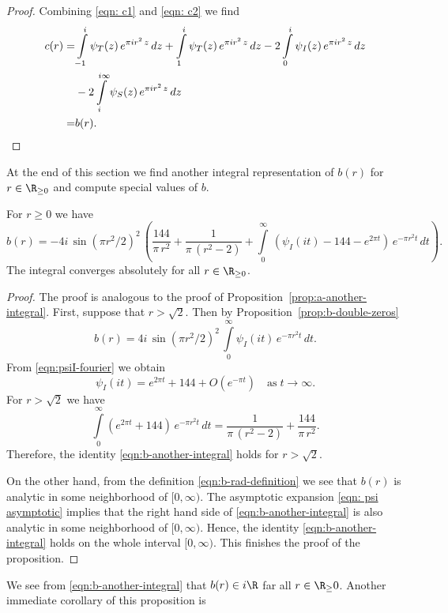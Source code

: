 \begin{proof}
Combining \eqref{eqn: c1} and \eqref{eqn: c2} we find
\begin{align}c(r)=&\int\limits_{-1}^{i}\psi_T(z)\,e^{\pi i r^2 \,z}\,dz+\int\limits_{1}^{i}\psi_T(z)\,e^{\pi i r^2 \,z}\,dz
-2\int\limits_{0}^{i}\psi_I(z)\,e^{\pi i r^2 \,z}\,dz\notag\\
&-2\int\limits_{i}^{i\infty}\psi_S(z)\,e^{\pi i r^2 \,z}\,dz\notag\\
=&b(r).\notag
    \end{align}
\end{proof}
At the end of this section we find another integral representation of $b(r)$ for $r\in\R_{\geq0}$ and compute special values of $b$.

\begin{proposition}\label{prop:b-another-integral}\leanok
For $r\geq0$ we have
\begin{equation}\label{eqn:b-another-integral}b(r)=-4i\,\sin(\pi r^2/2)^2\,\left(\frac{144}{\pi\,r^2}+\frac{1}{\pi\,(r^2-2)}+\int\limits_0^\infty\,\left(\psi_I(it)-144-e^{2\pi t}\right)\,e^{-\pi r^2 t}\,dt\right).\end{equation}
The integral converges absolutely for all $r\in\R_{\geq 0}$.
\end{proposition}
\begin{proof}\leanok
The proof is analogous to the proof of Proposition~\ref{prop:a-another-integral}.
First, suppose that $r>\sqrt{2}$. Then by Proposition~\ref{prop:b-double-zeros}
$$b(r)=4i\,\sin(\pi r^2/2)^2\,\int\limits_{0}^{\infty}\psi_I(it)\,e^{-\pi r^2 t}\,dt. $$
From \eqref{eqn:psiI-fourier} we obtain
\begin{equation}\label{eqn: psi asymptotic}
\psi_I(it)=e^{2\pi t}+144+O(e^{-\pi t})\quad\mbox{as}\;t\to\infty.
\end{equation}
For $r>\sqrt{2}$ we have
\begin{equation}
\int\limits_0^\infty \left(e^{2\pi t}+144\right)\,e^{-\pi r^2 t}\,dt
=\frac{1}{\pi\,(r^2-2)}+\frac{144}{\pi\,r^2}.\end{equation}
Therefore, the identity \eqref{eqn:b-another-integral} holds for $r>\sqrt{2}$.

On the other hand, from the definition \eqref{eqn:b-rad-definition} we see that $b(r)$ is analytic in some neighborhood of $[0,\infty)$. The asymptotic expansion \eqref{eqn: psi asymptotic} implies that the right hand side of \eqref{eqn:b-another-integral} is also analytic in some neighborhood of $[0,\infty)$. Hence, the identity \eqref{eqn:b-another-integral} holds on the whole interval $[0,\infty)$. This finishes the proof of the proposition.
\end{proof}
We see from \eqref{eqn:b-another-integral} that $b(r)\in i\R$ far all $r\in\R_\geq{0}$.
Another immediate corollary of this proposition is

